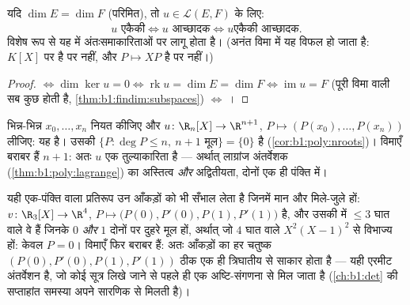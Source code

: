 \begin{corollary}\label{cor:b1:linmaps:samedim}
यदि $\dim E = \dim F$ (परिमित), तो $u \in \mathcal{L}(E, F)$ के लिए:
\[
u \text{ एकैकी} \iff u \text{ आच्छादक} \iff u \text{एकैकी आच्छादक}.
\]
विशेष रूप से यह  में अंतःसमाकारिताओं पर लागू होता है। (अनंत विमा
में यह विफल हो जाता है: $K[X]$ पर   है पर  नहीं, और $P
\mapsto XP$  है पर  नहीं।)
\end{corollary}

\begin{proof}
 $\iff \dim\ker u = 0 \iff \operatorname{rk} u = \dim E = \dim F \iff
\operatorname{im} u = F$ (पूरी विमा वाली  सब कुछ होती है,
\cref{thm:b1:findim:subspaces}) $\iff$ ।
\end{proof}

\begin{example}[अंतर्वेशन, संरचनात्मक दृष्टि से]\label{ex:b1:linmaps:interpolation}
भिन्न-भिन्न $x_0, \dots, x_n$ नियत कीजिए और $u \colon \R_n[X] \to \R^{n+1}$,
$P \mapsto (P(x_0), \dots, P(x_n))$ लीजिए: यह  है। उसकी  $\{P :
\deg P \leq n,\ n+1 \text{ मूल}\} = \{0\}$ है (\cref{cor:b1:poly:nroots})।
विमाएँ बराबर हैं $n + 1$: अतः $u$ एक तुल्याकारिता है --- अर्थात् लाग्रांज
अंतर्वेशक (\cref{thm:b1:poly:lagrange}) का अस्तित्व \emph{और} अद्वितीयता,
दोनों एक ही पंक्ति में।

यही एक-पंक्ति वाला प्रतिरूप उन आँकड़ों को भी सँभाल लेता है जिनमें मान और
 मिले-जुले हों: $v \colon \R_3[X] \to \R^4$, $P \mapsto \bigl(P(0),
P'(0), P(1), P'(1)\bigr)$  है, और उसकी  में $\leq 3$ घात वाले वे
 हैं जिनके $0$ \emph{और} $1$ दोनों पर दुहरे मूल हों, अर्थात् जो $4$ घात
वाले $X^2(X-1)^2$ से विभाज्य हों: केवल $P = 0$। विमाएँ फिर बराबर हैं: अतः
आँकड़ों का हर चतुष्क $(P(0), P'(0), P(1), P'(1))$ ठीक एक ही त्रिघातीय 
से साकार होता है --- यही एरमीट अंतर्वेशन है, जो कोई सूत्र लिखे जाने से पहले
ही एक अष्टि-संगणना से मिल जाता है (\cref{ch:b1:det} की सप्ताहांत समस्या अपने
सारणिक से मिलती है)।
\end{example}

